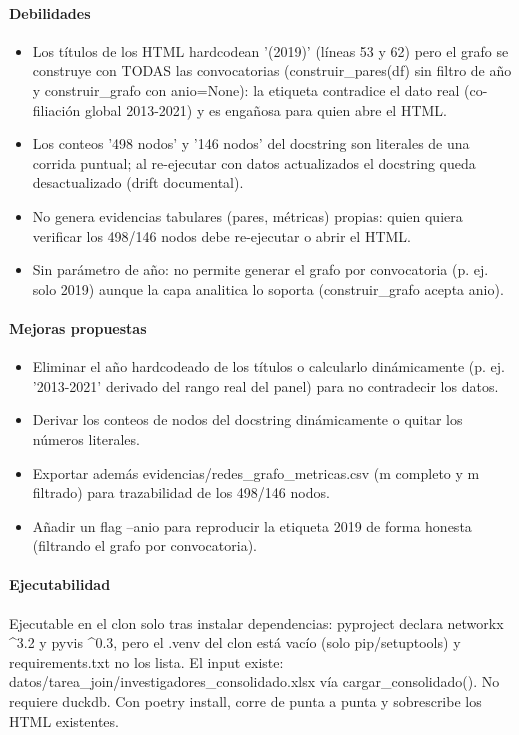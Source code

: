\paragraph{Debilidades}
\begin{itemize}
  \item Los títulos de los HTML hardcodean '(2019)' (líneas 53 y 62) pero el grafo se construye con TODAS las convocatorias (construir\_pares(df) sin filtro de año y construir\_grafo con anio=None): la etiqueta contradice el dato real (co-filiación global 2013-2021) y es engañosa para quien abre el HTML.
  \item Los conteos '498 nodos' y '146 nodos' del docstring son literales de una corrida puntual; al re-ejecutar con datos actualizados el docstring queda desactualizado (drift documental).
  \item No genera evidencias tabulares (pares, métricas) propias: quien quiera verificar los 498/146 nodos debe re-ejecutar o abrir el HTML.
  \item Sin parámetro de año: no permite generar el grafo por convocatoria (p. ej. solo 2019) aunque la capa analitica lo soporta (construir\_grafo acepta anio).
\end{itemize}

\paragraph{Mejoras propuestas}
\begin{itemize}
  \item Eliminar el año hardcodeado de los títulos o calcularlo dinámicamente (p. ej. '2013-2021' derivado del rango real del panel) para no contradecir los datos.
  \item Derivar los conteos de nodos del docstring dinámicamente o quitar los números literales.
  \item Exportar además evidencias/redes\_grafo\_metricas.csv (m completo y m filtrado) para trazabilidad de los 498/146 nodos.
  \item Añadir un flag --anio para reproducir la etiqueta 2019 de forma honesta (filtrando el grafo por convocatoria).
\end{itemize}

\paragraph{Ejecutabilidad}
Ejecutable en el clon solo tras instalar dependencias: pyproject declara networkx \textasciicircum{}3.2 y pyvis \textasciicircum{}0.3, pero el .venv del clon está vacío (solo pip/setuptools) y requirements.txt no los lista. El input existe: datos/tarea\_join/investigadores\_consolidado.xlsx vía cargar\_consolidado(). No requiere duckdb. Con poetry install, corre de punta a punta y sobrescribe los HTML existentes.

